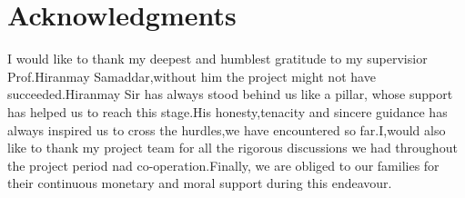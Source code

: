 \cleardoublepage
{}
{}
\chapter*{Acknowledgments}
\vspace{1cm}
I would like to thank my deepest and humblest gratitude to my supervisior Prof.Hiranmay Samaddar,without him the project might not have succeeded.Hiranmay Sir has always stood behind us like a pillar, whose support has helped us to reach this stage.His honesty,tenacity and sincere guidance has always inspired us to cross the hurdles,we have encountered so far.I,would also like to thank my project team for all the rigorous discussions we had throughout the project period nad co-operation.Finally, we are obliged to our families for their continuous monetary and moral support during this endeavour.
\\
\\
\\ 
\\

\newpage
